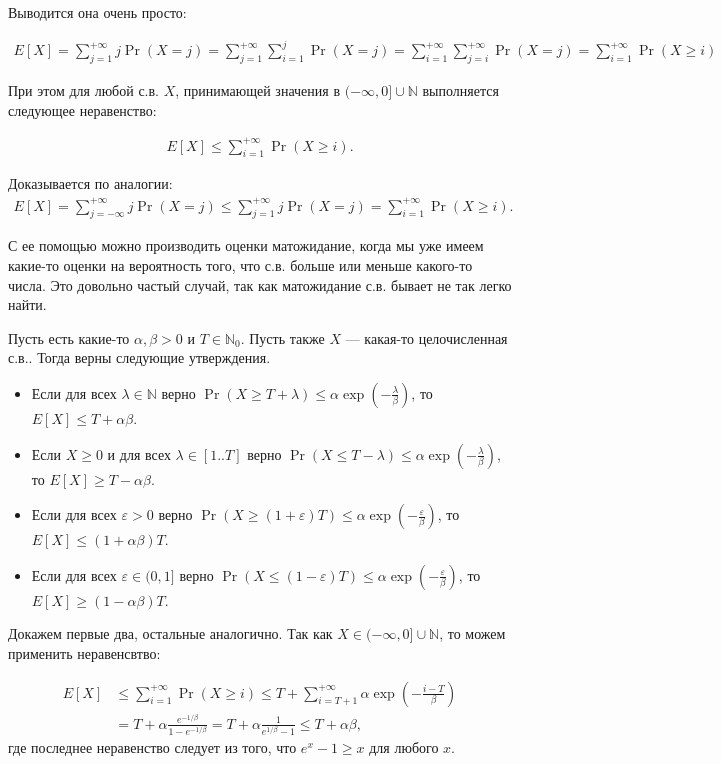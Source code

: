 \documentclass[12pt]{article}
\newcommand\N{\mathbb{N}}
\newcommand\eps{\varepsilon}
\begin{document}
Выводится она очень просто:

\begin{align*}
  E[X] = \sum_{j = 1}^{+\infty} j \Pr(X = j) = \sum_{j = 1}^{+\infty} \sum_{i = 1}^{j} \Pr(X = j) = \sum_{i = 1}^{+\infty} \sum_{j = i}^{+\infty} \Pr(X = j) = \sum_{i = 1}^{+\infty} \Pr(X \ge i)
\end{align*}

При этом для любой с.в. $X$, принимающей значения в $(-\infty, 0] \cup \N$ выполняется следующее неравенство:

\begin{align*}
  E[X] \le \sum_{i = 1}^{+\infty} \Pr(X \ge i).
\end{align*}

Доказывается по аналогии:
\begin{align*}
  E[X] = \sum_{j = -\infty}^{+\infty} j \Pr(X = j) \le \sum_{j = 1}^{+\infty} j \Pr(X = j) = \sum_{i = 1}^{+\infty} \Pr(X \ge i).
\end{align*}

С ее помощью можно производить оценки матожидание, когда мы уже имеем какие-то оценки на вероятность того, что с.в. больше или меньше какого-то числа. Это довольно частый случай, так как матожидание с.в. бывает не так легко найти.

Пусть есть какие-то $\alpha, \beta > 0$ и $T \in \N_0$. Пусть также $X$ --- какая-то целочисленная с.в.. Тогда верны следующие утверждения.

\begin{itemize}
  \item Если для всех $\lambda \in \N$ верно $\Pr(X \ge T + \lambda) \le \alpha \exp(-\frac{\lambda}{\beta})$, то $E[X] \le T + \alpha\beta$.
  \item Если $X \ge 0$ и для всех $\lambda \in [1..T]$ верно $\Pr(X \le T - \lambda) \le \alpha \exp(-\frac{\lambda}{\beta})$, то $E[X] \ge T - \alpha\beta$.
  \item Если для всех $\eps > 0$ верно $\Pr(X \ge (1 + \eps)T) \le \alpha \exp(-\frac{\eps}{\beta})$, то $E[X] \le (1 + \alpha\beta)T$.
  \item Если для всех $\eps \in (0, 1]$ верно $\Pr(X \le (1 -\eps)T) \le \alpha \exp(-\frac{\eps}{\beta})$, то $E[X] \ge (1 - \alpha\beta)T$.
\end{itemize}

Докажем первые два, остальные аналогично. Так как $X \in (-\infty, 0] \cup \N$, то можем применить неравенсвтво:

\begin{align*}
  E[X] &\le \sum_{i = 1}^{+\infty} \Pr(X \ge i) \le T + \sum_{i = T + 1}^{+\infty} \alpha \exp\left(-\frac{i - T}{\beta}\right) \\
       &= T + \alpha \frac{e^{-1/\beta}}{1 - e^{-1/\beta}} = T + \alpha \frac{1}{e^{1/\beta} - 1} \le T + \alpha\beta,
\end{align*}
где последнее неравенство следует из того, что $e^x - 1 \ge x$ для любого $x$.
\end{document}
